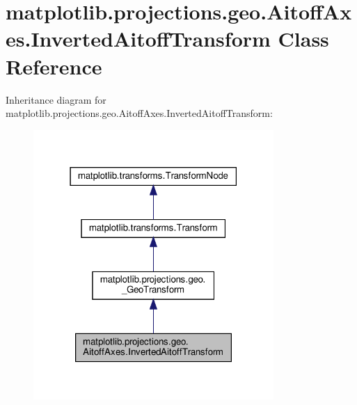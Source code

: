 \hypertarget{classmatplotlib_1_1projections_1_1geo_1_1AitoffAxes_1_1InvertedAitoffTransform}{}\section{matplotlib.\+projections.\+geo.\+Aitoff\+Axes.\+Inverted\+Aitoff\+Transform Class Reference}
\label{classmatplotlib_1_1projections_1_1geo_1_1AitoffAxes_1_1InvertedAitoffTransform}


Inheritance diagram for matplotlib.\+projections.\+geo.\+Aitoff\+Axes.\+Inverted\+Aitoff\+Transform\+:
\nopagebreak
\begin{figure}[H]
\begin{center}
\leavevmode
\includegraphics[width=259pt]{classmatplotlib_1_1projections_1_1geo_1_1AitoffAxes_1_1InvertedAitoffTransform__inherit__graph}
\end{center}
\end{figure}


